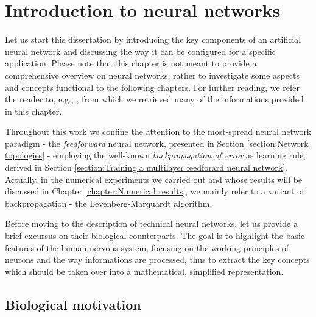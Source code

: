 \documentclass[12pt, a4paper, twoside, openright]{report}
\numberwithin{equation}{chapter}
\theoremstyle{theorem}
\theoremstyle{definition}
\theoremstyle{remark}
\theoremstyle{proposition}
\numberwithin{figure}{chapter}
\begin{document}
	\chapter{Introduction to neural networks}
	\label{chapter:Introduction to neural networks}
	
	
		Let us start this dissertation by introducing the key components of an artificial neural network and discussing the way it can be configured for a specific application. Please note that this chapter is not meant to provide a comprehensive overview on neural networks, rather to investigate some aspects and concepts functional to the following chapters. For further reading, we refer the reader to, e.g., \cite{Hag14, Hay05, Kri}, from which we retrieved many of the informations provided in this chapter.
		
		Throughout this work we confine the attention to the most-spread neural network paradigm - the \emph{feedforward} neural network, presented in Section \ref{section:Network topologies} - employing the well-known \emph{backpropagation of error} as learning rule, derived in Section \ref{section:Training a multilayer feedforard neural network}. Actually, in the numerical experiments we carried out and whose results will be discussed in Chapter \ref{chapter:Numerical results}, we mainly refer to a variant of backpropagation - the Levenberg-Marquardt algorithm.
		
		Before moving to the description of technical neural networks, let us provide a brief excursus on their biological counterparts. The goal is to highlight the basic features of the human nervous system, focusing on the working principles of neurons and the way informations are processed, thus to extract the key concepts which should be taken over into a mathematical, simplified representation.
		
	\vspace*{0.3cm} 
		
	\section{Biological motivation}
	\label{section:Biological motivation} 
	
\end{document}
